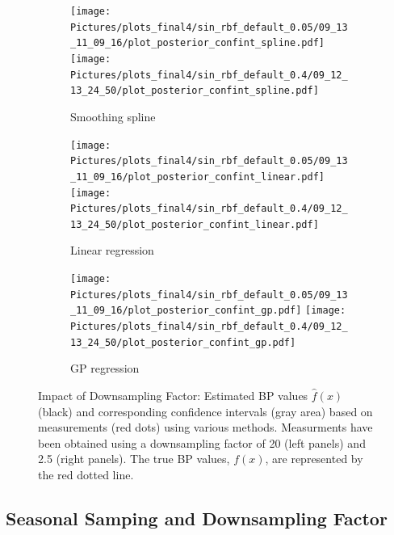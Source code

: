 \begin{figure}
\begin{subfigure}{\textwidth}
    \centering
    \texttt{[image: 
       Pictures/plots\_final4/sin\_rbf\_default\_0.05/09\_13\_11\_09\_16/plot\_posterior\_confint\_spline.pdf]}
    \texttt{[image: 
       Pictures/plots\_final4/sin\_rbf\_default\_0.4/09\_12\_13\_24\_50/plot\_posterior\_confint\_spline.pdf]}
  \caption{Smoothing spline}
\end{subfigure}

\begin{subfigure}{\textwidth}
    \centering
    \texttt{[image: 
  Pictures/plots\_final4/sin\_rbf\_default\_0.05/09\_13\_11\_09\_16/plot\_posterior\_confint\_linear.pdf]}
    \texttt{[image: 
  Pictures/plots\_final4/sin\_rbf\_default\_0.4/09\_12\_13\_24\_50/plot\_posterior\_confint\_linear.pdf]}
  \caption{Linear regression }
\end{subfigure}

\begin{subfigure}{\textwidth}
    \centering
    \texttt{[image: 
  Pictures/plots\_final4/sin\_rbf\_default\_0.05/09\_13\_11\_09\_16/plot\_posterior\_confint\_gp.pdf]}
    \texttt{[image: 
  Pictures/plots\_final4/sin\_rbf\_default\_0.4/09\_12\_13\_24\_50/plot\_posterior\_confint\_gp.pdf]}
  \caption{GP regression}
\end{subfigure}\hfill

\caption[Impact of Downsampling Factor]{Impact of Downsampling Factor:
    Estimated BP values $\hat{f}(x)$ (black) and corresponding confidence intervals
    (gray area) based on measurements (red dots) using various methods.
    Measurments have been obtained using a
    downsampling factor of 20 (left panels) and 2.5 (right panels).
    The true BP values, $f(x)$, are represented by the red dotted line.}
\label{fig:ex-downsampling-factor}
\end{figure}


\subsection{Seasonal Samping and Downsampling Factor}


